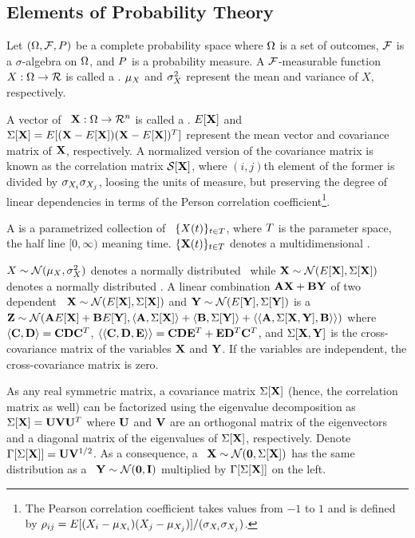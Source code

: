 \subsection{Elements of Probability Theory} 
Let $(\Omega, \mathcal{F}, P)$ be a complete probability space \cite{durrett2010} where $\Omega$ is a set of outcomes, $\mathcal{F}$ is a $\sigma$-algebra on $\Omega$, and $P$ is a probability measure. A $\mathcal{F}$-measurable function $X: \Omega \to \mathcal{R}$ is called a . $\mu_{X}$ and $\sigma_{X}^2$ represent the mean and variance of $X$, respectively.

A vector of \rvs\ $\mathbf{X}: \Omega \to \mathcal{R}^n$ is called a . $E[\mathbf{X}]$ and $\Sigma[\mathbf{X}] = E[(\mathbf{X} - E[\mathbf{X}])(\mathbf{X} - E[\mathbf{X}])^T]$ represent the mean vector and covariance matrix of $\mathbf{X}$, respectively. A normalized version of the covariance matrix is known as the correlation matrix $\mathcal{S}[{\mathbf{X}}]$, where $(i,j)$th element of the former is divided by $\sigma_{X_i} \sigma_{X_j}$, loosing the units of measure, but preserving the degree of linear dependencies in terms of the Person correlation coefficient\footnote{The Pearson correlation coefficient takes values from $-1$ to $1$ and is defined by $\rho_{ij} = E[(X_i - \mu_{X_i})(X_j - \mu_{X_j})]/(\sigma_{X_i}\sigma_{X_j})$.}.

A  is a parametrized collection of \rvs\ $\{ X(t) \}_{t \in T}$, where $T$ is the parameter space, the half line $[0, \infty)$ meaning time. $\{ \mathbf{X}(t) \}_{t \in T}$ denotes a multidimensional \sp.

$X \sim \mathcal{N}(\mu_{X}, \sigma_{X}^2)$ denotes a normally distributed \rv\ while $\mathbf{X} \sim \mathcal{N}(E[\mathbf{X}], \Sigma[\mathbf{X}])$ denotes a normally distributed \mrv. A linear combination $\mathbf{A} \mathbf{X} + \mathbf{B} \mathbf{Y}$ of two dependent \mnrvs\ $\mathbf{X} \sim \mathcal{N}(E[\mathbf{X}], \Sigma[\mathbf{X}])$ and $\mathbf{Y} \sim \mathcal{N}(E[\mathbf{Y}], \Sigma[\mathbf{Y}])$ is a \mnrv\ $\mathbf{Z} \sim \mathcal{N}(\mathbf{A} E[\mathbf{X}] + \mathbf{B} E[\mathbf{Y}], \langle \mathbf{A}, \Sigma[\mathbf{X}] \rangle + \langle \mathbf{B}, \Sigma[\mathbf{Y}] \rangle + \langle \langle \mathbf{A}, \Sigma[\mathbf{X}, \mathbf{Y}], \mathbf{B} \rangle \rangle)$ where $\langle \mathbf{C}, \mathbf{D} \rangle = \mathbf{C} \mathbf{D} \mathbf{C}^T$, $\langle \langle \mathbf{C}, \mathbf{D}, \mathbf{E} \rangle \rangle = \mathbf{C} \mathbf{D} \mathbf{E}^T + \mathbf{E} \mathbf{D}^T \mathbf{C}^T$, and $\Sigma[\mathbf{X}, \mathbf{Y}]$ is the cross-covariance matrix of the variables $\mathbf{X}$ and $\mathbf{Y}$. If the variables are independent, the cross-covariance matrix is zero.

As any real symmetric matrix, a covariance matrix $\Sigma[\mathbf{X}]$ (hence, the correlation matrix as well) can be factorized using the eigenvalue decomposition \cite{press2007} as $\Sigma[\mathbf{X}] = \mathbf{U} \mathbf{V} \mathbf{U}^T$ where $\mathbf{U}$ and $\mathbf{V}$ are an orthogonal matrix of the eigenvectors and a diagonal matrix of the eigenvalues of $\Sigma[\mathbf{X}]$, respectively. Denote $\Gamma[\Sigma[\mathbf{X}]] = \mathbf{U} \mathbf{V}^{1/2}$. As a consequence, a \mnrv\ $\mathbf{X} \sim \mathcal{N}(\mathbf{0}, \Sigma[\mathbf{X}])$ has the same distribution as a \msnrv\ $\mathbf{Y} \sim \mathcal{N}(\mathbf{0}, \mathbf{I})$ multiplied by $\Gamma[\Sigma[\mathbf{X}]]$ on the left.

